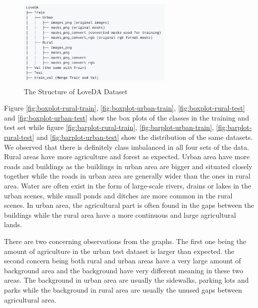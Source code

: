 \FloatBarrier
\begin{figure}[!h]
\includegraphics[width=7.5cm, height=4.5cm]{images/loveda-structure.png}
\centering
\caption{The Structure of LoveDA Dataset}
\label{fig:loveda-structure}
\end{figure}

Figure \ref{fig:boxplot-rural-train}, \ref{fig:boxplot-urban-train}, \ref{fig:boxplot-rural-test} and \ref{fig:boxplot-urban-test} show the box plots of the classes in the training and test set while figure \ref{fig:barplot-rural-train}, \ref{fig:barplot-urban-train}, \ref{fig:barplot-rural-test} and \ref{fig:barplot-urban-test} show the distribution of the same datasets. We observed that there is definitely class imbalanced in all four sets of the data. Rural areas have more agriculture and forest as expected. Urban area have more roads and buildings as the buildings in urban area are bigger and situated closely together while the roads in urban area are generally wider than the ones in rural area. Water are often exist in the form of large-scale rivers, drains or lakes in the urban scenes, while small ponds and ditches are more common in the rural scenes. In urban area, the agricultural part is often found in the gaps between the buildings while the rural area have a more continuous and large agricultural lands.

There are two concerning observations from the graphs. The first one being the amount of agriculture in the urban test dataset is larger than expected. the second concern being both rural and urban areas have a very large amount of background area and the background have very different meaning in these two areas. The background in urban area are usually the sidewalks, parking lots and parks while the background in rural area are usually the unused gaps between agricultural area. 

